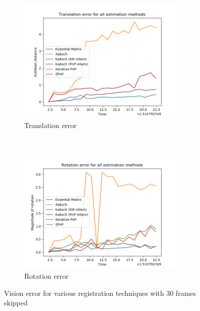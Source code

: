 \documentclass[12pt,a4paper]{article}
\begin{document}
\begin{figure}[h]
  \begin{subfigure}[t]{0.5\textwidth}
  \centering
    \includegraphics[width=80mm]{../quad/basic-reg-saves/et_all_30.png}
    \caption{Translation error}
  \end{subfigure} %
  ~
  \begin{subfigure}[t]{0.5\textwidth}
    \includegraphics[width=80mm]{../quad/basic-reg-saves/eR_all_30.png}
    \caption{Rotation error}
  \end{subfigure}
  \caption{Vision error for various registration techniques with 30 frames skipped}
  \label{f: quad3 error 30}
\end{figure}
\end{document}
